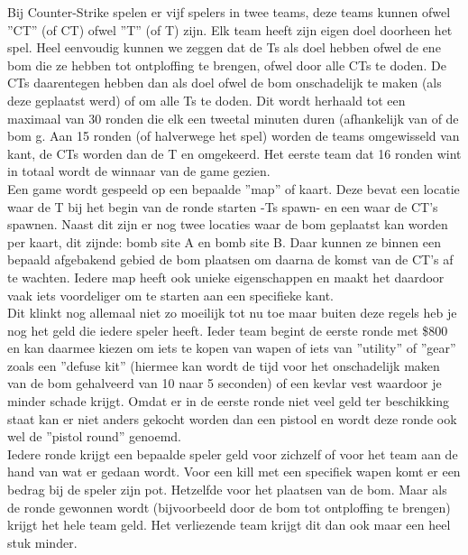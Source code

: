 \documentclass[pdftex,a4paper,12pt,twoside]{report}
\begin{document}
Bij Counter-Strike spelen er vijf spelers in twee teams, deze teams kunnen ofwel ''\gls{CT}'' (of CT) ofwel ''\gls{T}'' (of T) zijn. Elk team heeft zijn eigen doel doorheen het spel. Heel eenvoudig kunnen we zeggen dat de \gls{T}s als doel hebben ofwel de ene bom die ze hebben tot ontploffing te brengen, ofwel door alle \gls{CT}s te doden. 
De \gls{CT}s daarentegen hebben dan als doel ofwel de bom onschadelijk te maken (als deze geplaatst werd) of om alle \gls{T}s te doden. Dit wordt herhaald tot een maximaal van 30 ronden die elk een tweetal minuten duren (afhankelijk van of de bom g. Aan 15 ronden (of halverwege het spel) worden de teams omgewisseld van kant, de \gls{CT}s worden dan de \gls{T} en omgekeerd. Het eerste team dat 16 ronden wint in totaal wordt de winnaar van de game gezien.
\\

Een game wordt gespeeld op een bepaalde ''\gls{map}'' of kaart. Deze bevat een locatie waar de \gls{T} bij het begin van de ronde starten -\gls{T}s \gls{spawn}- en een waar de CT's \gls{spawn}en. Naast dit zijn er nog twee locaties waar de bom geplaatst kan worden per kaart, dit zijnde: bomb site A en bomb site B. Daar kunnen ze binnen een bepaald afgebakend gebied de bom plaatsen om daarna de komst van de CT's af te wachten. Iedere \gls{map} heeft ook unieke eigenschappen en maakt het daardoor vaak iets voordeliger om te starten aan een specifieke kant.
\\

Dit klinkt nog allemaal niet zo moeilijk tot nu toe maar buiten deze regels heb je nog het geld die iedere speler heeft. Ieder team begint de eerste ronde met \$800 en kan daarmee kiezen om iets te kopen van wapen of iets van ''utility'' of ''gear'' zoals een ''defuse kit'' (hiermee kan wordt de tijd voor het onschadelijk maken van de bom gehalveerd van 10 naar 5 seconden) of een kevlar vest waardoor je minder schade krijgt. 
Omdat er in de eerste ronde niet veel geld ter beschikking staat kan er niet anders gekocht worden dan een pistool en wordt deze ronde ook wel de ''pistol round'' genoemd.
\\

Iedere ronde krijgt een bepaalde speler geld voor zichzelf of voor het team aan de hand van wat er gedaan wordt. Voor een kill met een specifiek wapen komt er een bedrag bij de speler zijn pot. Hetzelfde voor het plaatsen van de bom. Maar als de ronde gewonnen wordt (bijvoorbeeld door de bom tot ontploffing te brengen) krijgt het hele team geld. Het verliezende team krijgt dit dan ook maar een heel stuk minder.
\\
\end{document}
